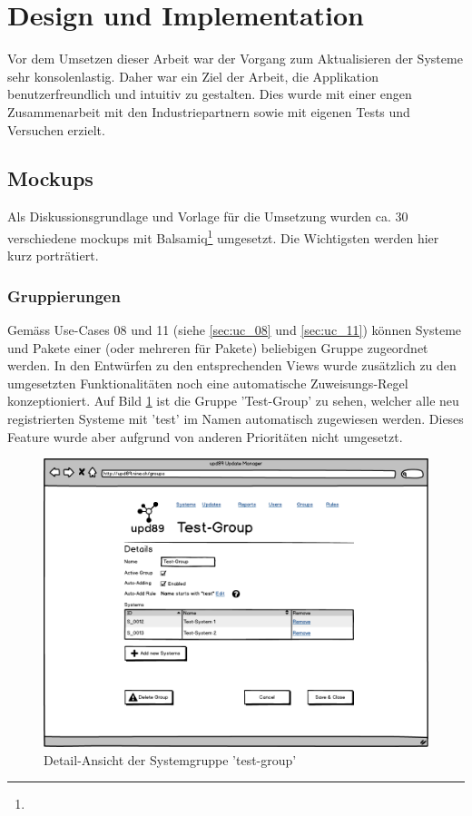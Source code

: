 \section{Design und Implementation}

Vor dem Umsetzen dieser Arbeit war der Vorgang zum Aktualisieren der Systeme sehr konsolenlastig. Daher war ein Ziel der Arbeit, die Applikation benutzerfreundlich und intuitiv zu gestalten. Dies wurde mit einer engen Zusammenarbeit mit den Industriepartnern sowie mit eigenen Tests und Versuchen erzielt.

\subsection*{Mockups} \label{design:mockups}

Als Diskussionsgrundlage und Vorlage für die Umsetzung wurden ca. 30 verschiedene \glspl{mockup} mit Balsamiq\footnote{} umgesetzt. Die Wichtigsten werden hier kurz porträtiert.

\subsubsection*{Gruppierungen}

Gemäss Use-Cases 08 und 11 (siehe \ref{sec:uc_08} und \ref{sec:uc_11}) können Systeme und Pakete einer (oder mehreren für Pakete) beliebigen Gruppe zugeordnet werden. In den Entwürfen zu den entsprechenden Views wurde zusätzlich zu den umgesetzten Funktionalitäten noch eine automatische Zuweisungs-Regel konzeptioniert. Auf Bild \ref{fig:design:group_systems_mockup} ist die Gruppe 'Test-Group' zu sehen, welcher alle neu registrierten Systeme mit 'test' im Namen automatisch zugewiesen werden. Dieses Feature wurde aber aufgrund von anderen Prioritäten nicht umgesetzt.

\begin{figure}[H]
	\centering
	\includegraphics[width=\linewidth]{files/mockups/group_systems}
	\caption{Detail-Ansicht der Systemgruppe 'test-group'}
	\label{fig:design:group_systems_mockup}
\end{figure}

